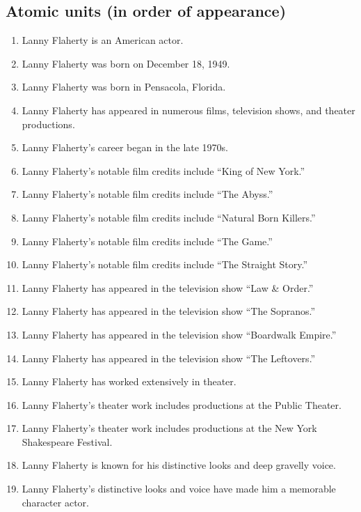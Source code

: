 \documentclass[11pt]{article}
\begin{document}
\subsection*{Atomic units (in order of appearance)}

\begin{enumerate}[label=\textbf{F\arabic*.},leftmargin=*]
  \item Lanny Flaherty is an American actor.
  \item Lanny Flaherty was born on December 18, 1949.
  \item Lanny Flaherty was born in Pensacola, Florida.
  \item Lanny Flaherty has appeared in numerous films, television shows, and theater productions.
  \item Lanny Flaherty's career began in the late 1970s.
  \item Lanny Flaherty's notable film credits include ``King of New York.''
  \item Lanny Flaherty's notable film credits include ``The Abyss.''
  \item Lanny Flaherty's notable film credits include ``Natural Born Killers.''
  \item Lanny Flaherty's notable film credits include ``The Game.''
  \item Lanny Flaherty's notable film credits include ``The Straight Story.''
  \item Lanny Flaherty has appeared in the television show ``Law \& Order.''
  \item Lanny Flaherty has appeared in the television show ``The Sopranos.''
  \item Lanny Flaherty has appeared in the television show ``Boardwalk Empire.''
  \item Lanny Flaherty has appeared in the television show ``The Leftovers.''
  \item Lanny Flaherty has worked extensively in theater.
  \item Lanny Flaherty's theater work includes productions at the Public Theater.
  \item Lanny Flaherty's theater work includes productions at the New York Shakespeare Festival.
  \item Lanny Flaherty is known for his distinctive looks and deep gravelly voice.
  \item Lanny Flaherty's distinctive looks and voice have made him a memorable character actor.
\end{enumerate}
\end{document}
